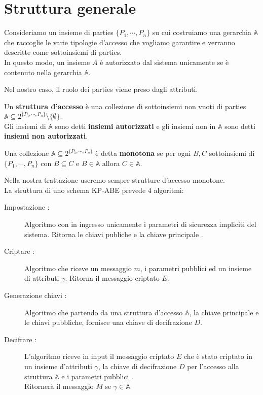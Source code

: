 \section{Struttura generale}

Consideriamo un insieme di parties $\{P_1, \cdots , P_n \}$ su cui costruiamo una gerarchia $\mathbb{A}$ che raccoglie le varie tipologie d'accesso che vogliamo garantire e verranno descritte come sottoinsiemi di parties.\\
In questo modo, un insieme $A$ è autorizzato dal sistema unicamente se è contenuto nella gerarchia $\mathbb{A}$.

Nel nostro caso, il ruolo dei parties viene preso dagli attributi.
\vspace{0.3cm}

\begin{defi}
Un \textbf{struttura d'accesso} è una collezione di sottoinsiemi non vuoti di parties $\mathbb{A} \subseteq 2^{\{ P_1,\cdots,P_n \}} \setminus \{ \emptyset \}$.\\
Gli insiemi di $\mathbb{A}$ sono detti \textbf{insiemi autorizzati} e gli insiemi non in $\mathbb{A}$ sono detti \textbf{insiemi non autorizzati}.
\end{defi}
\vspace{0.3cm}
\begin{defi}
Una collezione $\mathbb{A} \subseteq 2^{\{P_1,\cdots,P_n\}}$ è detta \textbf{monotona} se per ogni $B,C$ sottoinsiemi di $\{ P_1,\cdots,P_n \}$ con $B \subseteq C$ e $B \in \mathbb{A}$ allora $C \in \mathbb{A}$.
\end{defi}

Nella nostra trattazione useremo sempre strutture d'accesso monotone.\\[0.7cm]




La struttura di uno schema KP-ABE prevede 4 algoritmi:
\begin{description}
\item[Impostazione :] Algoritmo con in ingresso unicamente i parametri di sicurezza impliciti del sistema. Ritorna le chiavi publiche \pk e la chiave principale \mk.
\item[Criptare :] Algoritmo che riceve un messaggio $m$, i parametri pubblici \pk ed un insieme di attributi $\gamma$. Ritorna il messaggio criptato $E$.
\item[Generazione chiavi :] Algoritmo che partendo da una struttura d'accesso $\mathbb{A}$, la chiave principale \mk e le chiavi pubbliche, fornisce una chiave di decifrazione $D$.
\item[Decifrare :]L'algoritmo riceve in input il messaggio criptato $E$ che è stato criptato in un insieme d'attributi $\gamma$, la chiave di decifrazione $D$ per l'accesso alla struttura $\mathbb{A}$ e i parametri pubblici \pk.\\
Ritornerà il messaggio $M$ se $\gamma \in \mathbb{A}$
\end{description}

